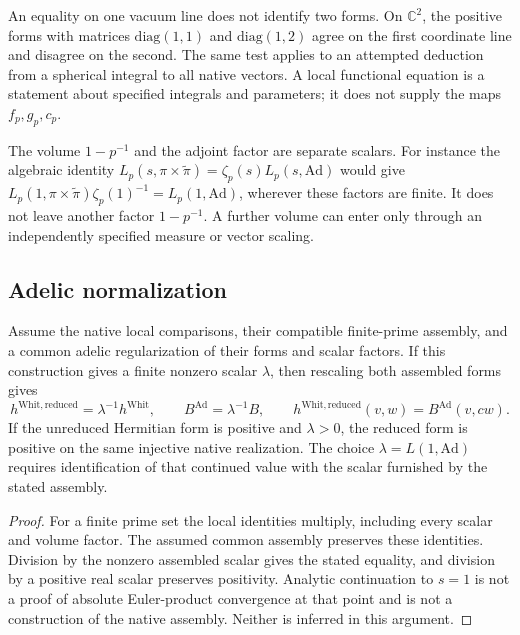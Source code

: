 \begin{remark}
\label{v4-arith:bcglue-k5:rem:K5-domain}
An equality on one vacuum line does not identify two forms. On
\(\mathbb C^2\), the positive forms with matrices
\(\mathrm{diag}(1,1)\) and \(\mathrm{diag}(1,2)\) agree on the first
coordinate line and disagree on the second. The same test applies to
an attempted deduction from a spherical integral to all native vectors.
A local functional equation is a statement about specified integrals
and parameters; it does not supply the maps \(f_p,g_p,c_p\).
\end{remark}

\begin{remark}
\label{v4-arith:bcglue-k5:eq:GJ-funeq}
The volume \(1-p^{-1}\) and the adjoint factor are separate scalars.
For instance the algebraic identity
\(L_p(s,\pi\times\widetilde\pi)=\zeta_p(s)L_p(s,\mathrm{Ad})\)
would give
\(L_p(1,\pi\times\widetilde\pi)\zeta_p(1)^{-1}
 =L_p(1,\mathrm{Ad})\), wherever these factors are finite. It does
not leave another factor \(1-p^{-1}\). A further volume can enter
only through an independently specified measure or vector scaling.
\end{remark}

\subsection{Adelic normalization}

\begin{theorem}
\label{v4-arith:bcglue-k5:thm:K5-adelic-consistent}
Assume the native local comparisons, their compatible finite-prime
assembly, and a common adelic regularization of their forms and scalar
factors. If this construction gives a finite nonzero scalar
\(\lambda\), then rescaling both assembled forms gives
\[
       h^{\mathrm{Whit,reduced}}=\lambda^{-1}h^{\mathrm{Whit}},
       \qquad B^{\mathrm{Ad}}=\lambda^{-1}B,
       \qquad h^{\mathrm{Whit,reduced}}(v,w)=B^{\mathrm{Ad}}(v,cw).
\]
If the unreduced Hermitian form is positive and \(\lambda>0\), the
reduced form is positive on the same injective native realization.
The choice \(\lambda=L(1,\mathrm{Ad})\) requires identification of
that continued value with the scalar furnished by the stated assembly.
\end{theorem}
\begin{proof}
For a finite prime set the local identities multiply, including every
scalar and volume factor. The assumed common assembly preserves these
identities. Division by the nonzero assembled scalar gives the stated
equality, and division by a positive real scalar preserves positivity.
Analytic continuation to \(s=1\) is not a proof of absolute Euler-product
convergence at that point and is not a construction of the native
assembly. Neither is inferred in this argument.
\end{proof}

